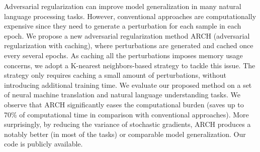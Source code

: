 Adversarial regularization can improve model generalization in many natural language processing tasks. However, conventional approaches are computationally expensive since they need to generate a perturbation for each sample in each epoch. We propose a new adversarial regularization method ARCH (adversarial regularization with caching), where perturbations are generated and cached once every several epochs. As caching all the perturbations imposes memory usage concerns, we adopt a K-nearest neighbors-based strategy to tackle this issue. The strategy only requires caching a small amount of perturbations, without introducing additional training time. We evaluate our proposed method on a set of neural machine translation and natural language understanding tasks. We observe that ARCH significantly eases the computational burden (saves up to 70\% of computational time in comparison with conventional approaches). More surprisingly, by reducing the variance of stochastic gradients, ARCH produces a notably better (in most of the tasks) or comparable model generalization. Our code is publicly available.
